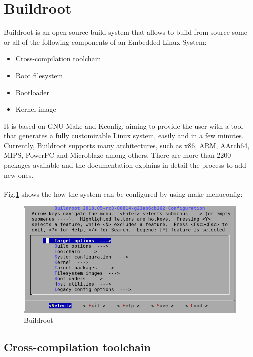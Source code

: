 \documentclass[12pt,a4paper,oneside]{article}
\begin{document}
\newpage
\section{Buildroot}

Buildroot is an open source build system that allows to build from source some
or all of the following components of an Embedded Linux System:
\begin{itemize}
  \item Cross-compilation toolchain
  \item Root filesystem
  \item Bootloader
  \item Kernel image
\end{itemize}
It is based on GNU Make and Kconfig, aiming to provide the user with a tool that
generates a fully customizable Linux system, easily and in a few minutes. Currently,
Buildroot supports many architectures, such as x86, ARM, AArch64, MIPS, PowerPC
and Microblaze among others. There are more than 2200 packages available and the
documentation explains in detail the process to add new ones.\\\\
Fig.\ref{fig:menuconfig} shows the how the system can be configured by using
{\selectfont make menuconfig}:
\begin{figure}[H]
\centering
  \includegraphics[scale=0.5]{img/menuconfig.png}
  \caption{Buildroot}
  \label{fig:menuconfig}
\end{figure}

\subsection{Cross-compilation toolchain}
\end{document}
